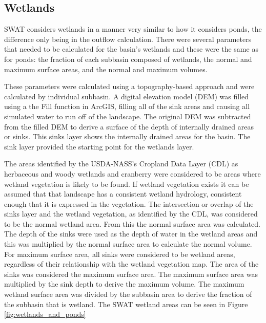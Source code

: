 \subsection{Wetlands}\label{sec:wetlands}

	SWAT considers wetlands in a manner very similar to how it considers ponds, the difference only being in the outflow calculation. There were several parameters that needed to be calculated for the basin's wetlands and these were the same as for ponds: the fraction of each subbasin composed of wetlands, the normal and maximum surface areas, and the normal and maximum volumes. 
	
	These parameters were calculated using a topography-based approach and were calculated by individual subbasin. A digital elevation model (DEM) was filled using a the Fill function in ArcGIS, filling all of the sink areas and causing all simulated water to run off of the landscape. The original DEM was subtracted from the filled DEM to derive a surface of the depth of internally drained areas or sinks.  This sinks layer shows the internally drained areas for the basin. The sink layer provided the starting point for the wetlands layer. 
	
	The areas identified by the USDA-NASS's Cropland Data Layer (CDL) as herbaceous and woody wetlands and cranberry were considered to be areas where wetland vegetation is likely to be found. If wetland vegetation exists it can be assumed that that landscape has a consistent wetland hydrology, consistent enough that it is expressed in the vegetation. The intersection or overlap of the sinks layer and the wetland vegetation, as identified by the CDL, was considered to be the normal wetland area. From this the normal surface area was calculated. The depth of the sinks were used as the depth of water in the wetland areas and this was multiplied by the normal surface area to calculate the normal volume. For maximum surface area, all sinks were considered to be wetland areas, regardless of their relationship with the wetland vegetation map. The area of the sinks was considered the maximum surface area. The maximum surface area was multiplied by the sink depth to derive the maximum volume. The maximum wetland surface area was divided by the subbasin area to derive the fraction of the subbasin that is wetland. The SWAT wetland areas can be seen in Figure \ref{fig:wetlands_and_ponds}

